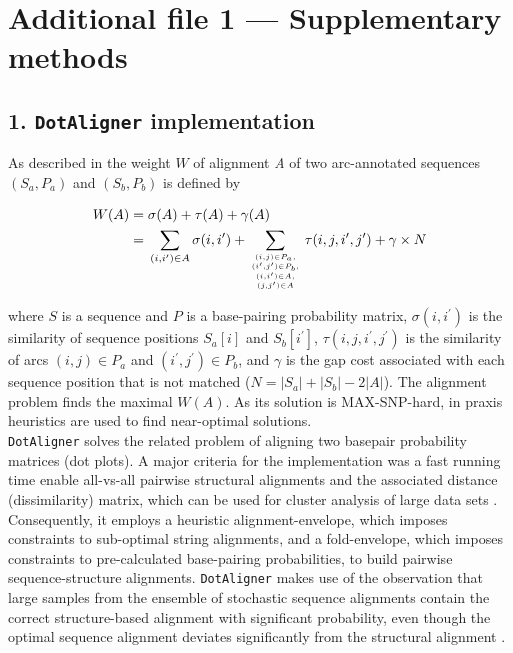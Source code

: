 \documentclass{bmcart}
\newcommand\dotaligner{\texttt{DotAligner}}
\begin{document}
\section*{Additional file 1 --- Supplementary methods}

\subsection*{ 1. \dotaligner{} implementation }
\noindent As described in \cite{Palu2010} the weight $W$ of alignment \emph{A}
of two arc-annotated sequences $(S_a,P_a)$ and $(S_b,P_b)$ is defined by

\begin{equation}\label{eq1}
\begin{aligned}
	W(A) ={} & \sigma(A) + \tau(A) + \gamma(A) \\
	     ={} & \sum_{(i,i^\prime) \in A} \sigma(i,i^\prime) + \sum_{(i,j) \in
	P_a,\atop {(i^\prime,j^\prime) \in P_b,\atop {(i,i^\prime) \in
	A,\atop (j,j^\prime) \in A}}} \tau(i,j,i^\prime,j^\prime) + \gamma
	\times N
\end{aligned}
\end{equation}

\noindent where $S$ is a sequence and $P$ is a base-pairing probability matrix,
$\sigma(i,i^\prime)$ is the similarity of sequence positions $S_a[i]$ and
$S_b[i^\prime]$, $\tau(i,j,i^\prime,j^\prime)$ is the similarity of arcs $(i,j)
\in P_a$ and $(i^\prime,j^\prime) \in P_b$,
and $\gamma$ is the gap cost associated with each sequence position that is not
matched ($N = |S_a|+|S_b|-2|A|$). The alignment problem finds the maximal
$W(A)$. As its solution is MAX-SNP-hard, in praxis heuristics are used to find
near-optimal solutions.\\

\dotaligner{} solves the related problem of aligning two basepair
probability matrices (dot plots). A major criteria for the implementation was a fast
running time enable all-vs-all pairwise structural alignments and the 
associated distance (dissimilarity) matrix, which can be used for 
cluster analysis of large data sets \cite{Will17432929}. Consequently, 
it employs a heuristic alignment-envelope, 
which imposes constraints to sub-optimal string alignments, 
and a fold-envelope, which imposes constraints to pre-calculated base-pairing probabilities, 
to build pairwise sequence-structure alignments. 
\dotaligner{} makes use of the observation that large samples from the ensemble 
of stochastic sequence alignments contain the correct structure-based alignment
with significant probability,  even though the optimal
sequence alignment deviates significantly from the structural alignment
\cite{Muckstein12385998}. \\
\end{document}
